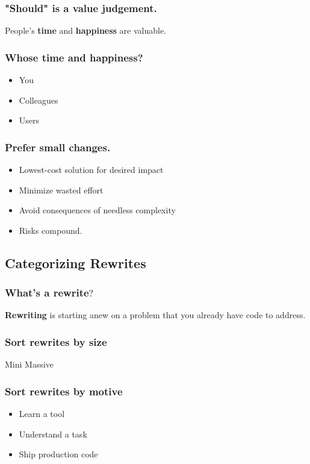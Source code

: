 \documentclass{beamer}
\begin{document}
\begin{frame}[fragile]
\frametitle{"Should" is a value judgement.}
People's \textbf{time} and \textbf{happiness} are valuable.
\end{frame}

\begin{frame}[fragile]
\frametitle{Whose time and happiness?}
\begin{itemize}[<+(1)->]
\item You
\item Colleagues
\item Users
\end{itemize}
\end{frame}

\begin{frame}[fragile]
\frametitle{Prefer small changes.}
\begin{itemize}[<+(1)->]
\item Lowest-cost solution for desired impact
\item Minimize wasted effort
\item Avoid consequences of needless complexity
\item Risks compound.
\end{itemize}
\end{frame}


\subsection{Categorizing Rewrites}

\begin{frame}[fragile]
\tableofcontents[currentsubsection]
\end{frame}


\begin{frame}[fragile]
\frametitle{What's a rewrite$?$}
\textbf{Rewriting} is starting anew on a problem that you already have code to
address.
\end{frame}

\begin{frame}[fragile]
\frametitle{Sort rewrites by size}
Mini \hrulefill Massive
\end{frame}

\begin{frame}[fragile]
\frametitle{Sort rewrites by motive}
\begin{itemize}[<+(1)->]
\item Learn a tool
\item Understand a task
\item Ship production code
\end{itemize}
\end{frame}
\end{document}
